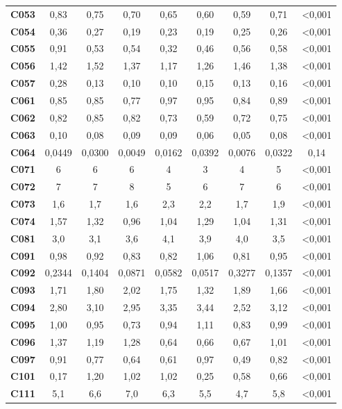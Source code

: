 \documentclass[
  12pt,
]{book}
\begin{document}
\begin{table}[!h]
{\begin{threeparttable}
\begin{tabular}[t]{lcccccccc}
\textbf{C053} & 0,83 & 0,75 & 0,70 & 0,65 & 0,60 & 0,59 & 0,71 & <0,001\\
\textbf{C054} & 0,36 & 0,27 & 0,19 & 0,23 & 0,19 & 0,25 & 0,26 & <0,001\\
\textbf{C055} & 0,91 & 0,53 & 0,54 & 0,32 & 0,46 & 0,56 & 0,58 & <0,001\\
\textbf{C056} & 1,42 & 1,52 & 1,37 & 1,17 & 1,26 & 1,46 & 1,38 & <0,001\\
\addlinespace
\textbf{C057} & 0,28 & 0,13 & 0,10 & 0,10 & 0,15 & 0,13 & 0,16 & <0,001\\
\textbf{C061} & 0,85 & 0,85 & 0,77 & 0,97 & 0,95 & 0,84 & 0,89 & <0,001\\
\textbf{C062} & 0,82 & 0,85 & 0,82 & 0,73 & 0,59 & 0,72 & 0,75 & <0,001\\
\textbf{C063} & 0,10 & 0,08 & 0,09 & 0,09 & 0,06 & 0,05 & 0,08 & <0,001\\
\textbf{C064} & 0,0449 & 0,0300 & 0,0049 & 0,0162 & 0,0392 & 0,0076 & 0,0322 & 0,14\\
\addlinespace
\textbf{C071} & 6 & 6 & 6 & 4 & 3 & 4 & 5 & <0,001\\
\textbf{C072} & 7 & 7 & 8 & 5 & 6 & 7 & 6 & <0,001\\
\textbf{C073} & 1,6 & 1,7 & 1,6 & 2,3 & 2,2 & 1,7 & 1,9 & <0,001\\
\textbf{C074} & 1,57 & 1,32 & 0,96 & 1,04 & 1,29 & 1,04 & 1,31 & <0,001\\
\textbf{C081} & 3,0 & 3,1 & 3,6 & 4,1 & 3,9 & 4,0 & 3,5 & <0,001\\
\addlinespace
\textbf{C091} & 0,98 & 0,92 & 0,83 & 0,82 & 1,06 & 0,81 & 0,95 & <0,001\\
\textbf{C092} & 0,2344 & 0,1404 & 0,0871 & 0,0582 & 0,0517 & 0,3277 & 0,1357 & <0,001\\
\textbf{C093} & 1,71 & 1,80 & 2,02 & 1,75 & 1,32 & 1,89 & 1,66 & <0,001\\
\textbf{C094} & 2,80 & 3,10 & 2,95 & 3,35 & 3,44 & 2,52 & 3,12 & <0,001\\
\textbf{C095} & 1,00 & 0,95 & 0,73 & 0,94 & 1,11 & 0,83 & 0,99 & <0,001\\
\addlinespace
\textbf{C096} & 1,37 & 1,19 & 1,28 & 0,64 & 0,66 & 0,67 & 1,01 & <0,001\\
\textbf{C097} & 0,91 & 0,77 & 0,64 & 0,61 & 0,97 & 0,49 & 0,82 & <0,001\\
\textbf{C101} & 0,17 & 1,20 & 1,02 & 1,02 & 0,25 & 0,58 & 0,66 & <0,001\\
\textbf{C111} & 5,1 & 6,6 & 7,0 & 6,3 & 5,5 & 4,7 & 5,8 & <0,001\\

\end{tabular}
\end{threeparttable}}
\end{table}
\end{document}
